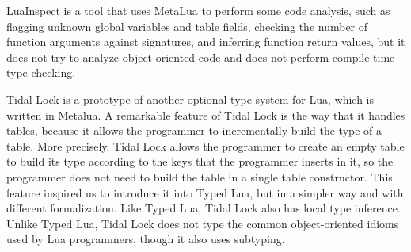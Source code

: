 LuaInspect \citep{luainspect} is a tool that uses MetaLua to perform
some code analysis, such as flagging unknown global variables and
table fields, checking the number of function arguments against
signatures, and inferring function return values, but it does not
try to analyze object-oriented code and does not perform compile-time
type checking.

Tidal Lock \citep{tidallock} is a prototype of another optional type
system for Lua, which is written in Metalua.
A remarkable feature of Tidal Lock is the way that it handles tables,
because it allows the programmer to incrementally build the type of
a table.
More precisely, Tidal Lock allows the programmer to create an empty
table to build its type according to the keys that the programmer
inserts in it, so the programmer does not need to build the table in
a single table constructor.
This feature inspired us to introduce it into Typed Lua,
but in a simpler way and with different formalization.
Like Typed Lua, Tidal Lock also has local type inference.
Unlike Typed Lua, Tidal Lock does not type the common object-oriented
idioms used by Lua programmers, though it also uses subtyping.


